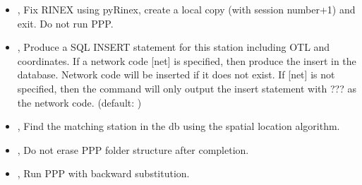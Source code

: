 \documentclass[letterpaper,10pt,english]{sphinxmanual}
\begin{document}
\begin{itemize}
\item {} 
\sphinxAtStartPar
{\hyperref[\detokenize{pgamit.com:LocateRinex.py--rnx}]{}}, {\hyperref[\detokenize{pgamit.com:LocateRinex.py---load_rinex}]{}} \sphinxhyphen{} Fix RINEX using pyRinex, create a local copy (with session number+1) and exit. Do not run PPP.

\item {} 
\sphinxAtStartPar
{\hyperref[\detokenize{pgamit.com:LocateRinex.py--ins}]{}} \sphinxcode{\sphinxupquote{{[}NET{]}}}, {\hyperref[\detokenize{pgamit.com:LocateRinex.py---insert_sql}]{}} \sphinxcode{\sphinxupquote{{[}NET{]}}} \sphinxhyphen{} Produce a SQL INSERT statement for this station including OTL and coordinates. If a network code {[}net{]} is specified, then produce the insert in the database. Network code will be inserted if it does not exist. If {[}net{]} is not specified, then the command will only output the insert statement with ??? as the network code. (default: )

\item {} 
\sphinxAtStartPar
{\hyperref[\detokenize{pgamit.com:LocateRinex.py--find}]{}}, {\hyperref[\detokenize{pgamit.com:LocateRinex.py---find}]{}} \sphinxhyphen{} Find the matching station in the db using the spatial location algorithm.

\item {} 
\sphinxAtStartPar
{\hyperref[\detokenize{pgamit.com:LocateRinex.py--ne}]{}}, {\hyperref[\detokenize{pgamit.com:LocateRinex.py---no_erase}]{}} \sphinxhyphen{} Do not erase PPP folder structure after completion.

\item {} 
\sphinxAtStartPar
{\hyperref[\detokenize{pgamit.com:LocateRinex.py--back}]{}}, {\hyperref[\detokenize{pgamit.com:LocateRinex.py---backward_substitution}]{}} \sphinxhyphen{} Run PPP with backward substitution.


\end{itemize}
\end{document}
